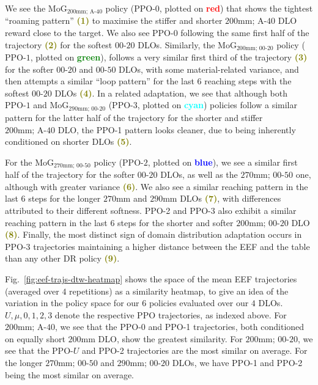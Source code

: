 We see the $\text{MoG}_{\text{200mm; A-40}}$ policy ($\text{PPO-}0$, plotted on \textcolor{red}{\textbf{red}}) that shows the tightest ``roaming pattern'' \textcolor{olive}{\textbf{(1)}} to maximise the stiffer and shorter $\text{200mm; A-40}$ DLO reward close to the target. 
We also see $\text{PPO-}0$ following the same first half of the trajectory \textcolor{olive}{\textbf{(2)}} for the softest $\text{00-20}$ DLOs. 
Similarly, the $\text{MoG}_{\text{200mm; 00-20}}$ policy ($\text{PPO-}1$, plotted on \textcolor{green}{\textbf{green}}), follows a very similar first third of the trajectory \textcolor{olive}{\textbf{(3)}} for the softer $\text{00-20}$ and $\text{00-50}$ DLOs, with some material-related variance, and then attempts a similar ``loop pattern'' for the last $6$ reaching steps with the softest $\text{00-20}$ DLOs \textcolor{olive}{\textbf{(4)}}. 
In a related adaptation, we see that although both $\text{PPO-}1$ and $\text{MoG}_{\text{290mm; 00-20}}$ ($\text{PPO-}3$, plotted on \textcolor{cyan}{\textbf{cyan}}) policies follow a similar pattern for the latter half of the trajectory for the shorter and stiffer $\text{200mm; A-40}$ DLO, the PPO-1 pattern looks cleaner, due to being inherently conditioned on shorter DLOs \textcolor{olive}{\textbf{(5)}}.

For the $\text{MoG}_{\text{270mm; 00-50}}$ policy ($\text{PPO-}2$, plotted on \textcolor{blue}{\textbf{blue}}), we see a similar first half of the trajectory for the softer $\text{00-20}$ DLOs, as well as the $\text{270mm; 00-50}$ one, although with greater variance \textcolor{olive}{\textbf{(6)}}. 
We also see a similar reaching pattern in the last $6$ steps for the longer $\text{270mm}$ and $\text{290mm}$ DLOs \textcolor{olive}{\textbf{(7)}}, with differences attributed to their different softness. 
PPO-2 and PPO-3 also exhibit a similar reaching pattern in the last $6$ steps for the shorter and softer $\text{200mm; 00-20}$ DLO \textcolor{olive}{\textbf{(8)}}. 
Finally, the most distinct sign of domain distribution adaptation occurs in PPO-3 trajectories maintaining a higher distance between the EEF and the table than any other DR policy \textcolor{olive}{\textbf{(9)}}.

Fig.~\ref{fig:eef-trajs-dtw-heatmap} shows the space of the mean EEF trajectories (averaged over $4$ repetitions) as a similarity heatmap, to give an idea of the variation in the policy space for our $6$ policies evaluated over our $4$ DLOs. 
$\mathit{U}, \mu, 0, 1, 2, 3$ denote the respective PPO trajectories, as indexed above. 
For $\text{200mm; A-40}$, we see that the PPO-0 and PPO-1 trajectories, both conditioned on equally short $\text{200mm}$ DLO, show the greatest similarity. 
For $\text{200mm; 00-20}$, we see that the $\text{PPO-}\mathit{U}$ and PPO-2 trajectories are the most similar on average. 
For the longer $\text{270mm; 00-50}$ and $\text{290mm; 00-20}$ DLOs, we have PPO-1 and PPO-2 being the most similar on average.

